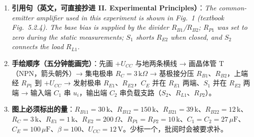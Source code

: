 \documentclass[11pt]{ctexart}
\begin{document}


\begin{enumerate}
  \item \textbf{引用句（英文，可直接抄进 II. Experimental Principles）}：\textit{The common-emitter amplifier used in this experiment is shown in Fig.~1 (textbook Fig.~5.2.4). The base bias is supplied by the divider $R_{B1}$/$R_{B2}$; $R_{P1}$ was set to zero during the static measurements; $S_1$ shorts $R_{E2}$ when closed, and $S_2$ connects the load $R_{L1}$.}
  \item \textbf{手绘顺序（五分钟能画完）}：先画 $+U_{CC}$ 与地两条横线 → 画晶体管 T（NPN，箭头朝外）→ 集电极串 $R_C=3\,\mathrm{k}\Omega$ → 基极接分压 $R_{B1}$、$R_{B2}$，上端经 $R_{P1}$ 到 $+U_{CC}$ → 发射极串 $R_{E1}$、$R_{E2}$，$C_E$ 并在 $R_{E1}$ 两端、$S_1$ 并在 $R_{E2}$ 两端 → 输入端 $C_1$ 串 $u_i$，输出端 $C_2$ 串负载支路（$S_2$、$R_{L1}$、$R_{P2}$）。
  \item \textbf{图上必须标出的量}：$R_{B11}=30\,\mathrm{k}$、$R_{B12}=150\,\mathrm{k}$、$R_{B21}=39\,\mathrm{k}$、$R_{B22}=12\,\mathrm{k}$、$R_C=3\,\mathrm{k}$、$R_{E1}=1\,\mathrm{k}$、$R_{E2}=200\,\Omega$、$R_{P1}=R_{P2}=10\,\mathrm{k}$、$C_1=C_2=27\,\mu\mathrm{F}$、$C_E=100\,\mu\mathrm{F}$、$\beta=100$、$U_{CC}=12\,\mathrm{V}$。少标一个，批阅时会被要求补。
\end{enumerate}

\end{document}

